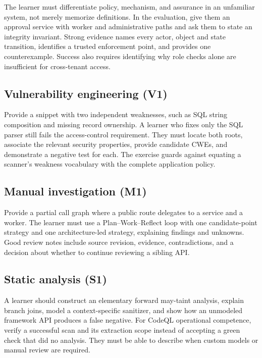 \documentclass[
  letterpaper,
]{article}
\begin{document}
The learner must differentiate policy, mechanism, and assurance in an
unfamiliar system, not merely memorize definitions. In the evaluation,
give them an approval service with worker and administrative paths and
ask them to state an integrity invariant. Strong evidence names every
actor, object and state transition, identifies a trusted enforcement
point, and provides one counterexample. Success also requires
identifying why role checks alone are insufficient for cross-tenant
access.

\subsection{Vulnerability engineering
(V1)}\label{vulnerability-engineering-v1}

Provide a snippet with two independent weaknesses, such as SQL string
composition and missing record ownership. A learner who fixes only the
SQL parser still fails the access-control requirement. They must locate
both roots, associate the relevant security properties, provide
candidate CWEs, and demonstrate a negative test for each. The exercise
guards against equating a scanner's weakness vocabulary with the
complete application policy.

\subsection{Manual investigation (M1)}\label{manual-investigation-m1}

Provide a partial call graph where a public route delegates to a service
and a worker. The learner must use a Plan--Work--Reflect loop with one
candidate-point strategy and one architecture-led strategy, explaining
findings and unknowns. Good review notes include source revision,
evidence, contradictions, and a decision about whether to continue
reviewing a sibling API.

\subsection{Static analysis (S1)}\label{static-analysis-s1}

A learner should construct an elementary forward may-taint analysis,
explain branch joins, model a context-specific sanitizer, and show how
an unmodeled framework API produces a false negative. For CodeQL
operational competence, verify a successful scan and its extraction
scope instead of accepting a green check that did no analysis. They must
be able to describe when custom models or manual review are required.
\end{document}
